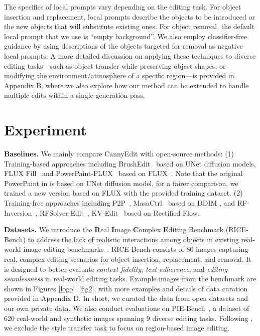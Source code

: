 \documentclass{article}
\begin{document}
The specifics of local prompts vary depending on the editing task. For object insertion and replacement, local prompts describe the objects to be introduced or the new objects that will substitute existing ones. For object removal, the default local prompt that we use is ``empty background''. We also employ classifier-free guidance \citep{ho2022classifier} by using descriptions of the objects targeted for removal as negative local prompts. A more detailed discussion on applying these techniques to diverse editing tasks—such as object transfer while preserving object shapes, or modifying the environment/atmosphere of a specific region—is provided in {Appendix B}, where we also explore how our method can be extended to handle multiple edits within a single generation pass.






\vspace{-1mm}
\section{Experiment}
\label{Sec:experiment}

\vspace{-1mm}

\textbf{Baselines.} We mainly compare CannyEdit with open-source methods: (1) Training-based approaches including BrushEdit~\cite{li2024brushedit} based on UNet diffusion models, FLUX Fill~\cite{blackforest2024FLUX} and PowerPaint-FLUX~\cite{zhuang2023task} based on FLUX~\cite{blackforest2024FLUX}. Note that the original PowerPaint in \cite{blackforest2024FLUX} is based on UNet diffusion model, for a fairer comparison, we trained a new version based on FLUX with the provided training dataset. (2) Training-free approaches including P2P~\cite{hertz2022prompt}, MasaCtrl~\cite{cao2023masactrl} based on DDIM \citep{song2022denoisingdiffusionimplicitmodels}, and RF-Inversion~\cite{rout2024semantic}, RFSolver-Edit~\cite{wang2024taming}, KV-Edit~\cite{zhu2025kv} based on Rectified
Flow. %

\textbf{Datasets.} We introduce the \textbf{R}eal \textbf{I}mage \textbf{C}omplex \textbf{E}diting Benchmark ({RICE-Bench}) to address the lack of realistic interactions among objects in existing real-world image editing benchmarks~\citep{sheynin2024emu,gu2024multi}. RICE-Bench consists of 80 images capturing real, complex editing scenarios for object insertion, replacement, and removal. It is designed to better evaluate \textit{context fidelity}, \textit{text adherence}, and \textit{editing seamlessness} in real-world editing tasks. Example images from the benchmark are shown in {Figures \ref{logo}, \ref{fig2}}, with more examples and details of data curation provided in Appendix D. In short, we curated the data from open datasets \citep{wasserman2024paint,ju2024pnp} and our own private data.
We also conduct evaluations on PIE-Bench~\cite{ju2024pnp}, a dataset of 620 real-world and synthetic images spanning 9 diverse editing tasks.
Following \cite{li2024brushedit, xu2023infedit, zhu2025kv}, we exclude the style transfer task to focus on region-based image editing.
\end{document}
